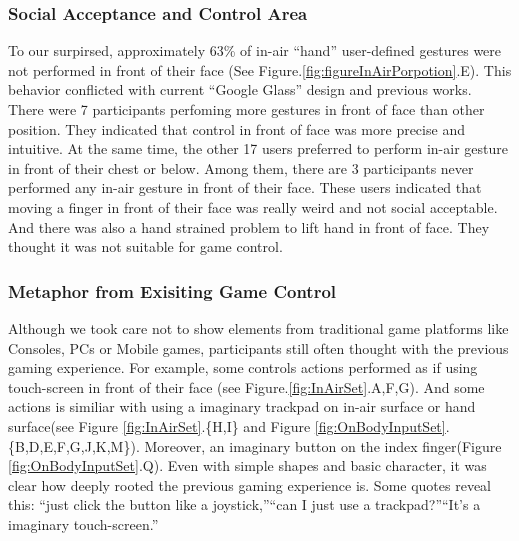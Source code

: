 \documentclass{sigchi}
\begin{document}
    \subsubsection{Social Acceptance and Control Area}
    To our surpirsed, approximately 63\% of in-air ``hand'' user-defined gestures were not performed in front of their face (See Figure.\ref{fig:figureInAirPorpotion}.E). This behavior conflicted with current ``Google Glass'' design and previous works\cite{Colaco:2013:MCL:2501988.2502042}. There were 7 participants perfoming more gestures in front of face than other position. They indicated that control in front of face was more precise and intuitive. At the same time, the other 17 users preferred to perform in-air gesture in front of their chest or below. Among them, there are 3 participants never performed any in-air gesture in front of their face. These users indicated that moving a finger in front of their face was really weird and not social acceptable. And there was also a hand strained problem to lift hand in front of face. They thought it was not suitable for game control.

    \subsubsection{Metaphor from Exisiting Game Control}
    Although we took care not to show elements from traditional game platforms like Consoles, PCs or Mobile games, participants still often thought with the previous gaming experience. For example, some controls actions performed as if using touch-screen in front of their face (see Figure.\ref{fig:InAirSet}.A,F,G). And some actions is similiar with using a imaginary trackpad on in-air surface or hand surface(see Figure \ref{fig:InAirSet}.\{H,I\} and Figure \ref{fig:OnBodyInputSet}.\{B,D,E,F,G,J,K,M\}). Moreover, an imaginary button on the index finger(Figure \ref{fig:OnBodyInputSet}.Q). Even with simple shapes and basic character, it was clear how deeply rooted the previous gaming experience is. Some quotes reveal this: ``just click the button like a joystick,''``can I just use a trackpad?''``It's a imaginary touch-screen.''
\end{document}
